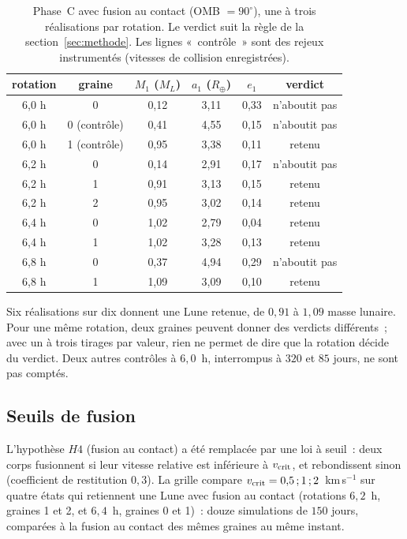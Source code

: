 \documentclass[11pt,a4paper]{article}
\newcommand{\Rt}{\ensuremath{R_\oplus}}
\newcommand{\ML}{\ensuremath{M_L}}
\begin{document}
\begin{table}[htbp]
\centering\small
\caption{Phase~C avec fusion au contact (OMB $=90^\circ$), une à trois réalisations par rotation. Le verdict suit la règle de la section~\ref{sec:methode}. Les lignes «~contrôle~» sont des rejeux instrumentés (vitesses de collision enregistrées).\label{tab:rotscan}}
\begin{tabular}{cccccc}\toprule rotation & graine & $M_1$ ($\ML$) & $a_1$ ($\Rt$) & $e_1$ & verdict\\\midrule
6,0 h & 0 & 0,12 & 3,11 & 0,33 & n'aboutit pas\\
6,0 h & 0 (contrôle) & 0,41 & 4,55 & 0,15 & n'aboutit pas\\
6,0 h & 1 (contrôle) & 0,95 & 3,38 & 0,11 & retenu\\
6,2 h & 0 & 0,14 & 2,91 & 0,17 & n'aboutit pas\\
6,2 h & 1 & 0,91 & 3,13 & 0,15 & retenu\\
6,2 h & 2 & 0,95 & 3,02 & 0,14 & retenu\\
6,4 h & 0 & 1,02 & 2,79 & 0,04 & retenu\\
6,4 h & 1 & 1,02 & 3,28 & 0,13 & retenu\\
6,8 h & 0 & 0,37 & 4,94 & 0,29 & n'aboutit pas\\
6,8 h & 1 & 1,09 & 3,09 & 0,10 & retenu\\\bottomrule\end{tabular}
\end{table}

Six réalisations sur dix donnent une Lune retenue, de $0{,}91$ à $1{,}09$ masse lunaire. Pour une même rotation, deux graines peuvent donner des verdicts différents~; avec un à trois tirages par valeur, rien ne permet de dire que la rotation décide du verdict. Deux autres contrôles à $6{,}0$~h, interrompus à $320$ et $85$ jours, ne sont pas comptés.

\subsection{Seuils de fusion}

L'hypothèse $H4$ (fusion au contact) a été remplacée par une loi à seuil~: deux corps fusionnent si leur vitesse relative est inférieure à $v_{\rm crit}$, et rebondissent sinon (coefficient de restitution $0{,}3$). La grille compare $v_{\rm crit}=0{,}5\,;1\,;2$~km\,s$^{-1}$ sur quatre états qui retiennent une Lune avec fusion au contact (rotations $6{,}2$~h, graines 1 et 2, et $6{,}4$~h, graines 0 et 1)~: douze simulations de $150$ jours, comparées à la fusion au contact des mêmes graines au même instant.
\end{document}

